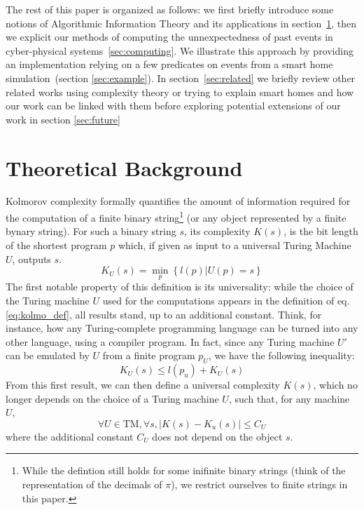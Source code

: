 \documentclass[conference]{IEEEtran}
\begin{document}
The rest of this paper is organized as follows: we first briefly introduce some notions of
Algorithmic Information Theory and its applications in section~\ref{sec:theory},
then we explicit our methods of computing the unnexpectedness of past events in
cyber-physical systems~\ref{sec:computing}. We illustrate this approach by
providing an implementation relying on a few predicates on events from a smart
home simulation~(section \ref{sec:example}). In section~\ref{sec:related} we briefly
review other related works using complexity theory or trying to explain smart
homes and how our work can be linked with them before exploring potential
extensions of our work in section \ref{sec:future}

\section{Theoretical Background}
\label{sec:theory}
Kolmorov complexity formally quantifies the amount of information required
for the computation of a finite binary string\footnote{While the defintion still
holds for some inifinite binary strings (think of the representation of the
decimals of $\pi$), we restrict ourselves to finite strings in this paper.} (or
any object represented by a finite bynary
string)\cite{kolmogorov_three_1965,li_introduction_2008}. For such a binary
string $s$, its complexity $K(s)$, is the bit length of the shortest program $p$
which, if given as input to a universal Turing Machine $U$, outputs $s$.
\begin{equation}
  \label{eq:kolmo_def}
  K_{U}(s) = \min_{p}\left\{l(p)|U(p)=s\right\}
\end{equation}
The first notable property of this definition is its universality: while the
choice of the Turing machine $U$ used for the computations appears in the
definition of eq. \ref{eq:kolmo_def}, all results stand, up to an additional
constant. Think, for instance, how any Turing-complete programming language can
be turned into any other language, using a compiler program. In fact, since any
Turing machine $U'$ can be emulated by $U$ from a
finite program $p_{U}$, we have the following inequality:
\begin{equation}
  \label{eq:inequality_univ}
  K_{U}(s) \le l(p_{u}) + K_{U}(s)
\end{equation}
From this first result, we can then define a universal complexity $K(s)$, which
no longer depends on the choice of a Turing machine $U$, such that, for any
machine $U$,
\begin{equation}
  \forall U\in\text{TM}, \forall s, |K(s) - K_{u}(s)| \le C_{U}
\end{equation}
where the additional constant $C_{U}$ does not depend on the object $s$.
\end{document}
